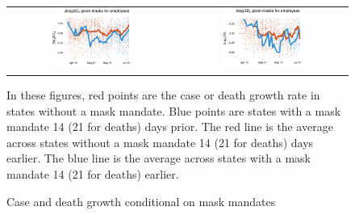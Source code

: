 \documentclass[3p, longtitle]{elsarticle}
\theoremstyle{definition}
\begin{document}
\clearpage
\begin{figure}[ht]
  \caption{Case and death growth conditional on mask mandates \label{fig:masks}}\vspace{0.2cm}
 \begin{minipage}{\linewidth}
    \centering
    \begin{tabular}{cc}
      \includegraphics[width=0.5\textwidth]{tables_and_figures/pmaskbus-cases-14}
      &
        \includegraphics[width=0.5\textwidth]{tables_and_figures/pmaskbus-deaths-21}
    \end{tabular}
    \begin{flushleft}
      \scriptsize In these figures, red points are the case or death
      growth rate in states without a mask mandate. Blue points are
      states with a mask mandate 14 (21 for deaths) days prior. The
      red line is the average across states without a mask mandate 14
      (21 for deaths) days earlier. The blue line is the average
      across states with a mask mandate 14 (21 for deaths) earlier.
    \end{flushleft}
  \end{minipage}%
\end{figure}
\end{document}
